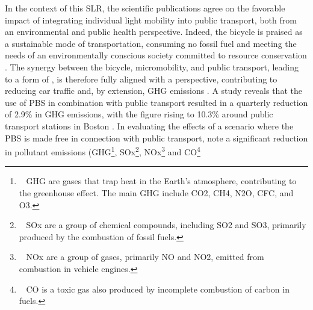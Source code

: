 \begin{refsegment}
In the context of this \acrshort{SLR}, the scientific publications agree on the favorable impact of integrating individual light mobility into public transport, both from an environmental and public health perspective. Indeed, the bicycle is praised as a sustainable mode of transportation, consuming no fossil fuel and meeting the needs of an environmentally conscious society committed to resource conservation \textcolor{blue}{\autocite[1935]{chen_study_2013}}. The synergy between the bicycle, micromobility, and public transport, leading to a form of , is therefore fully aligned with a  perspective, contributing to reducing car traffic and, by extension, \acrshort{GHG} emissions \textcolor{blue}{\autocites[4]{kostrzewska_towards_2017}[3111]{cho_estimation_2022}}. A study reveals that the use of \acrshort{PBS} in combination with public transport resulted in a quarterly reduction of 2.9\% in \acrshort{GHG} emissions, with the figure rising to 10.3\% around public transport stations in Boston \textcolor{blue}{\autocite[11-12]{basu_planning_2021}}. In evaluating the effects of a scenario where the \acrshort{PBS} is made free in connection with public transport, \textcolor{blue}{\textcite[49]{lu_improving_2018}} note a significant reduction in pollutant emissions (\acrshort{GHG}\footnote{~
    \acrshort{GHG} are gases that trap heat in the Earth’s atmosphere, contributing to the greenhouse effect. The main \acrshort{GHG} include \acrfull{CO2}, \acrfull{CH4}, \acrfull{N2O}, \acrfull{CFC}, and \acrfull{O3}.
}, \acrfull{SOx}\footnote{~
    \acrfull{SOx} are a group of chemical compounds, including \acrfull{SO2} and \acrfull{SO3}, primarily produced by the combustion of fossil fuels.
}, \acrfull{NOx}\footnote{~
    \acrfull{NOx} are a group of gases, primarily \acrfull{NO} and \acrfull{NO2}, emitted from combustion in vehicle engines.
} and \acrfull{CO}\footnote{~
    \acrfull{CO} is a toxic gas also produced by incomplete combustion of carbon in fuels.
}
\end{refsegment}

